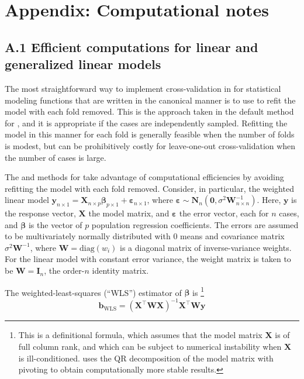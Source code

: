 \documentclass[
]{jss}
\begin{document}
\section*{Appendix: Computational
notes}\label{appendix-computational-notes}

\subsection*{A.1 Efficient computations for linear and generalized
linear
models}\label{a.1-efficient-computations-for-linear-and-generalized-linear-models}

The most straightforward way to implement cross-validation in
 for statistical modeling functions that are written in the
canonical manner is to use  to refit the model with each
fold removed. This is the approach taken in the default method for
, and it is appropriate if the cases are independently
sampled. Refitting the model in this manner for each fold is generally
feasible when the number of folds is modest, but can be prohibitively
costly for leave-one-out cross-validation when the number of cases is
large.

The  and  methods for  take advantage
of computational efficiencies by avoiding refitting the model with each
fold removed. Consider, in particular, the weighted linear model
\(\mathbf{y}_{n \times 1} = \mathbf{X}_{n \times p}\boldsymbol{\beta}_{p \times 1} + \boldsymbol{\varepsilon}_{n \times 1}\),
where
\(\boldsymbol{\varepsilon} \sim \mathbf{N}_n \left(\mathbf{0}, \sigma^2 \mathbf{W}^{-1}_{n \times n}\right)\).
Here, \(\mathbf{y}\) is the response vector, \(\mathbf{X}\) the model
matrix, and \(\boldsymbol{\varepsilon}\) the error vector, each for
\(n\) cases, and \(\boldsymbol{\beta}\) is the vector of \(p\)
population regression coefficients. The errors are assumed to be
multivariately normally distributed with 0 means and covariance matrix
\(\sigma^2 \mathbf{W}^{-1}\), where \(\mathbf{W} = \mathrm{diag}(w_i)\)
is a diagonal matrix of inverse-variance weights. For the linear model
with constant error variance, the weight matrix is taken to be
\(\mathbf{W} = \mathbf{I}_n\), the order-\(n\) identity matrix.

The weighted-least-squares (``WLS'') estimator of \(\boldsymbol{\beta}\)
is \citep[see, e.g.,][Sec. 12.2.2]{Fox:2016} \footnote{This is a
  definitional formula, which assumes that the model matrix
  \(\mathbf{X}\) is of full column rank, and which can be subject to
  numerical instability when \(\mathbf{X}\) is ill-conditioned.
   uses the QR decomposition of the model matrix with
  pivoting to obtain computationally more stable results.} \[
\mathbf{b}_{\mathrm{WLS}} = \left( \mathbf{X}^\top \mathbf{W} \mathbf{X} \right)^{-1}
  \mathbf{X}^\top \mathbf{W} \mathbf{y}
\]
\end{document}
